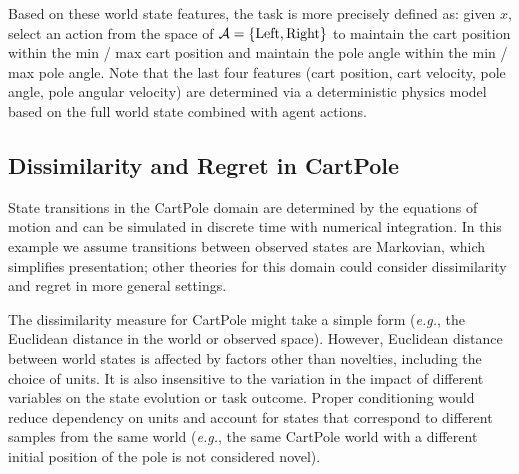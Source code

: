 Based on these world state features, the task is more precisely defined as: given $x$, select an action from the space of ${\cal A}=\{\text{Left},\text{Right}\}$  to maintain the cart position within the min / max cart position and maintain the pole angle within the min / max pole angle. Note that the last four features (cart position, cart velocity, pole angle, pole angular velocity) are determined via a  deterministic physics model based on the full world state combined with agent actions.


\subsection{Dissimilarity and Regret in CartPole}

State transitions in the CartPole domain are determined by the equations of motion and can be simulated in discrete time with numerical integration.
In this example we  assume transitions between observed states are Markovian, which simplifies presentation;   other theories for this domain could consider dissimilarity and regret in more general settings. 

The dissimilarity measure for CartPole might take a simple form (\textit{e.g.}, the Euclidean distance in the world or observed space).
However, Euclidean distance between world states is affected by factors  other than novelties,
including  the choice of units. It is also insensitive to the  variation in the impact of different variables on the state evolution or task outcome.  
Proper conditioning would reduce dependency on units and account for states that correspond to different samples from the same world (\textit{e.g.}, the same CartPole world with a different initial position of the pole is not considered novel).

